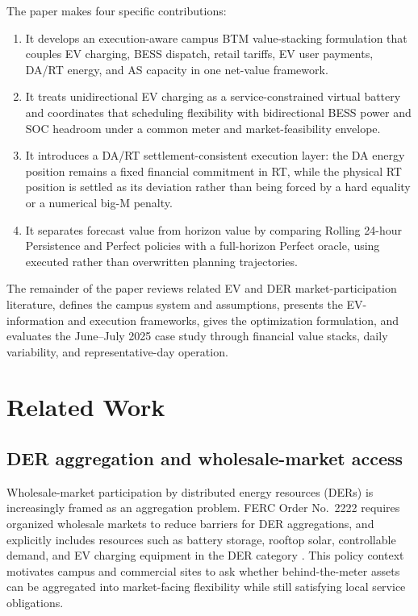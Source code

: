 \documentclass[final,5p,times]{elsarticle}
\begin{document}
The paper makes four specific contributions:
\begin{enumerate}[leftmargin=*]
    \item It develops an execution-aware campus BTM value-stacking formulation that couples EV charging, BESS dispatch, retail tariffs, EV user payments, DA/RT energy, and AS capacity in one net-value framework.
    \item It treats unidirectional EV charging as a service-constrained virtual battery and coordinates that scheduling flexibility with bidirectional BESS power and SOC headroom under a common meter and market-feasibility envelope.
    \item It introduces a DA/RT settlement-consistent execution layer: the DA energy position remains a fixed financial commitment in RT, while the physical RT position is settled as its deviation rather than being forced by a hard equality or a numerical big-M penalty.
    \item It separates forecast value from horizon value by comparing Rolling 24-hour Persistence and Perfect policies with a full-horizon Perfect oracle, using executed rather than overwritten planning trajectories.
\end{enumerate}

The remainder of the paper reviews related EV and DER market-participation literature, defines the campus system and assumptions, presents the EV-information and execution frameworks, gives the optimization formulation, and evaluates the June--July 2025 case study through financial value stacks, daily variability, and representative-day operation.

\section{Related Work}
\label{sec:related_work}

\subsection{DER aggregation and wholesale-market access}
Wholesale-market participation by distributed energy resources (DERs) is increasingly framed as an aggregation problem. FERC Order No.~2222 requires organized wholesale markets to reduce barriers for DER aggregations, and explicitly includes resources such as battery storage, rooftop solar, controllable demand, and EV charging equipment in the DER category \cite{ferc2222}. This policy context motivates campus and commercial sites to ask whether behind-the-meter assets can be aggregated into market-facing flexibility while still satisfying local service obligations.
\end{document}
